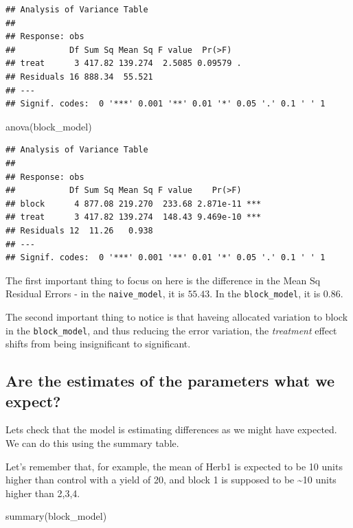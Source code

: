 \documentclass[
]{book}
\newenvironment{Shaded}{\begin{snugshade}}{\end{snugshade}}
\newcommand{\FunctionTok}[1]{\textcolor[rgb]{0.00,0.00,0.00}{#1}}
\newcommand{\NormalTok}[1]{#1}
\begin{document}
\begin{verbatim}
## Analysis of Variance Table
## 
## Response: obs
##           Df Sum Sq Mean Sq F value  Pr(>F)  
## treat      3 417.82 139.274  2.5085 0.09579 .
## Residuals 16 888.34  55.521                  
## ---
## Signif. codes:  0 '***' 0.001 '**' 0.01 '*' 0.05 '.' 0.1 ' ' 1
\end{verbatim}

\begin{Shaded}
\begin{Highlighting}[]
\FunctionTok{anova}\NormalTok{(block\_model)}
\end{Highlighting}
\end{Shaded}

\begin{verbatim}
## Analysis of Variance Table
## 
## Response: obs
##           Df Sum Sq Mean Sq F value    Pr(>F)    
## block      4 877.08 219.270  233.68 2.871e-11 ***
## treat      3 417.82 139.274  148.43 9.469e-10 ***
## Residuals 12  11.26   0.938                      
## ---
## Signif. codes:  0 '***' 0.001 '**' 0.01 '*' 0.05 '.' 0.1 ' ' 1
\end{verbatim}

The first important thing to focus on here is the difference in the Mean Sq Residual Errors - in the \texttt{naive\_model}, it is \(55.43\). In the \texttt{block\_model}, it is \(0.86\).

The second important thing to notice is that haveing allocated variation to block in the \texttt{block\_model}, and thus reducing the error variation, the \emph{treatment} effect shifts from being insignificant to significant.

\hypertarget{are-the-estimates-of-the-parameters-what-we-expect}{%
\subsection{Are the estimates of the parameters what we expect?}\label{are-the-estimates-of-the-parameters-what-we-expect}}

Lets check that the model is estimating differences as we might have expected. We can do this using the summary table.

Let's remember that, for example, the mean of Herb1 is expected to be 10 units higher than control with a yield of 20, and block 1 is supposed to be \textasciitilde10 units higher than 2,3,4.

\begin{Shaded}
\begin{Highlighting}[]
\FunctionTok{summary}\NormalTok{(block\_model)}
\end{Highlighting}
\end{Shaded}
\end{document}
